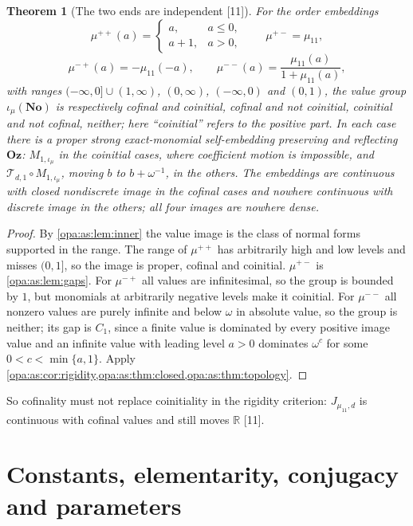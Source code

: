 \documentclass[11pt,oneside]{article}
\numberwithin{equation}{section}
\newtheorem{theorem}{Theorem}[section]
\theoremstyle{definition}
\theoremstyle{remark}
\newcommand{\No}{\mathbf{No}}
\newcommand{\Oz}{\mathbf{Oz}}
\newcommand{\R}{\mathbb R}
\newcommand{\src}[1]{\textup{\textsf{\small[#1]}}}
\begin{document}
\begin{theorem}[The two ends are independent \src{11}]\label{opa:as:thm:four}
For the order embeddings
\[
 \mu^{++}(a)=\begin{cases}a,&a\le0,\\a+1,&a>0,\end{cases}\qquad
 \mu^{+-}=\mu_{11},
\]
\[
 \mu^{-+}(a)=-\mu_{11}(-a),\qquad
 \mu^{--}(a)=\frac{\mu_{11}(a)}{1+\mu_{11}(a)},
\]
with ranges $(-\infty,0]\cup(1,\infty)$, $(0,\infty)$, $(-\infty,0)$ and $(0,1)$, the value group
$\iota_\mu(\No)$ is respectively cofinal and coinitial, cofinal and not coinitial, coinitial and not
cofinal, neither; here ``coinitial'' refers to the positive part. In each case there is a proper strong
exact-monomial self-embedding preserving and reflecting $\Oz$: $M_{1,\iota_\mu}$ in the coinitial cases,
where coefficient motion is impossible, and $\mathcal T_{d,1}\circ M_{1,\iota_\mu}$, moving $b$ to
$b+\omega^{-1}$, in the others. The embeddings are continuous with closed nondiscrete image in the cofinal
cases and nowhere continuous with discrete image in the others; all four images are nowhere dense.
\end{theorem}
\begin{proof}
By \cref{opa:as:lem:inner} the value image is the class of normal forms supported in the range. The range of
$\mu^{++}$ has arbitrarily high and low levels and misses $(0,1]$, so the image is proper, cofinal and
coinitial. $\mu^{+-}$ is \cref{opa:as:lem:gaps}. For $\mu^{-+}$ all values are infinitesimal, so the group is
bounded by $1$, but monomials at arbitrarily negative levels make it coinitial. For $\mu^{--}$ all nonzero
values are purely infinite and below $\omega$ in absolute value, so the group is neither; its gap is $C_1$,
since a finite value is dominated by every positive image value and an infinite value with leading level
$a>0$ dominates $\omega^c$ for some $0<c<\min\{a,1\}$. Apply \cref{opa:as:cor:rigidity,opa:as:thm:closed,opa:as:thm:topology}.
\end{proof}

So cofinality must not replace coinitiality in the rigidity criterion: $J_{\mu_{11},d}$ is continuous with
cofinal values and still moves $\R$ \src{11}.

\section{Constants, elementarity, conjugacy and parameters}\label{opa:as:sec:model}
\end{document}
